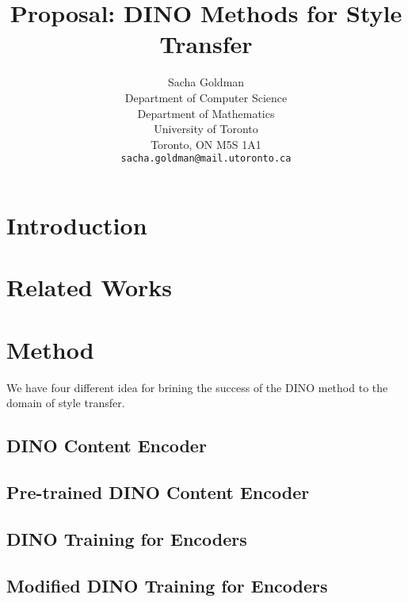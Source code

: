 \documentclass{article}
\title{Proposal: DINO Methods for Style Transfer}
\author{
  Sacha Goldman \\
  Department of Computer Science\\ 
  Department of Mathematics\\
  University of Toronto\\
  Toronto, ON M5S 1A1 \\
  \texttt{sacha.goldman@mail.utoronto.ca} \\
}
\begin{document}
\maketitle

\begin{abstract}

\end{abstract}

\section{Introduction}



\section{Related Works}



\section{Method}

We have four different idea for brining the success of the DINO method to the domain of style transfer.

\subsection{DINO Content Encoder} 

\subsection{Pre-trained DINO Content Encoder}

\subsection{DINO Training for Encoders}

\subsection{Modified DINO Training for Encoders}

\medskip

\nocite{*}


\end{document}

